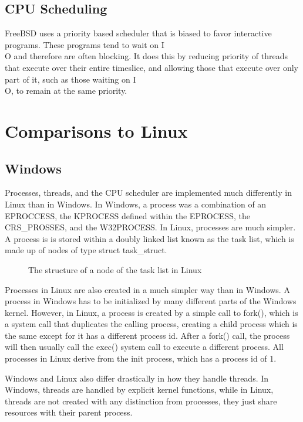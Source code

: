 \documentclass[journal,letterpaper,draftclsnofoot,onecolumn,10pt]{IEEEtran}
\begin{document}
\subsection{CPU Scheduling}
FreeBSD uses a priority based scheduler that is biased to favor interactive programs. These programs tend to wait on I\\O and therefore are often blocking. It does this by reducing priority of threads that execute over their entire timeslice, and allowing those that execute over only part of it, such as those waiting on I\\O, to remain at the same priority.\cite{mn15}

\section{Comparisons to Linux}

\subsection{Windows}
Processes, threads, and the CPU scheduler are implemented much differently in Linux than in Windows. In Windows, a process was a combination of an EPROCCESS, the KPROCESS defined within the EPROCESS, the CRS\_PROSSES, and the W32PROCESS. In Linux, processes are much simpler. A process is is stored within a doubly linked list known as the task list, which is made up of nodes of type struct task\_struct.\cite{l05}

\begin{figure}[h]

\caption{The structure of a node of the task list in Linux}
\end{figure}

Processes in Linux are also created in a much simpler way than in Windows. A process in Windows has to be initialized by many different parts of the Windows kernel. However, in Linux, a process is created by a simple call to fork(), which is a system call that duplicates the calling process, creating a child process which is the same except for it has a different process id. After a fork() call, the process will then usually call the exec() system call to execute a different process. All processes in Linux derive from the init process, which has a process id of 1.\cite{l05}

Windows and Linux also differ drastically in how they handle threads. In Windows, threads are handled by explicit kernel functions, while in Linux, threads are not created with any distinction from processes, they just share resources with their parent process.\cite{l05}
\end{document}

